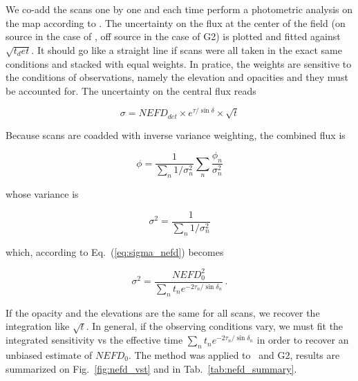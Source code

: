 We co-add the scans one by one and each time perform a photometric analysis on
the map according to {}. The uncertainty on
the flux at the center of the field (on source in the case of \hls, off source
in the case of G2) is plotted and fitted against $\sqrt{t_det}$. It should go
like a straight line if scans were all taken in the exact same conditions and
stacked with equal weights. In pratice, the weights are sensitive to the
conditions of observations, namely the elevation and opacities  and they must be accounted for. The
uncertainty on the central flux reads

\begin{equation}
\sigma = NEFD_{det}\times e^{\tau/\sin\delta}\times\sqrt{t}
\label{eq:sigma_nefd}
\end{equation}

Because scans are coadded with inverse variance weighting, the combined flux is

\begin{equation}
\phi = \frac{1}{\sum_n 1/\sigma_n^2}\sum_n\frac{\phi_n}{\sigma_n^2}
\end{equation}

whose variance is

\begin{equation}
\sigma^2 = \frac{1}{\sum_n 1/\sigma_n^2}
\end{equation}

which, according to Eq.~(\ref{eq:sigma_nefd}) becomes

\begin{equation}
\sigma^2 = \frac{NEFD_0^2}{\sum_{n}t_n e^{-2\tau_n/\sin\delta_n}}\,.
\label{eq:sigma_tau_w8}
\end{equation}

If the opacity and the elevations are the same for all scans, we recover the
integration like $\sqrt{t}$. In general, if the observing conditions vary, we
must fit the integrated sensitivity vs the effective time $\sum_{n}t_n
e^{-2\tau_n/\sin\delta_n}$ in order to recover an unbiased estimate of
$NEFD_0$. The method was applied to \hls\ and G2, results are summarized on
Fig.~\ref{fig:nefd_vst} and in Tab.~\ref{tab:nefd_summary}.

